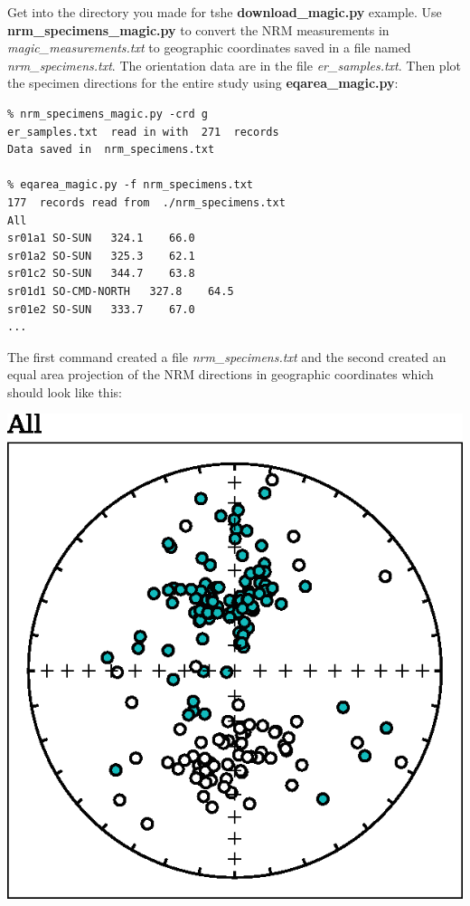 \documentclass[11pt]{book}
\begin{document}
{{{Get into the directory you made for tshe {\bf download\_magic.py} example.   \newline Use {\bf nrm\_specimens\_magic.py} to convert the NRM measurements in  {\it magic\_measurements.txt }   to geographic coordinates saved in a file named {\it nrm\_specimens.txt}.  The orientation data are in the file {\it er\_samples.txt}.    Then plot the specimen directions for the entire study using {\bf eqarea\_magic.py}:
 
 
 \begin{verbatim}
% nrm_specimens_magic.py -crd g
er_samples.txt  read in with  271  records
Data saved in  nrm_specimens.txt

% eqarea_magic.py -f nrm_specimens.txt
177  records read from  ./nrm_specimens.txt
All
sr01a1 SO-SUN   324.1    66.0
sr01a2 SO-SUN   325.3    62.1
sr01c2 SO-SUN   344.7    63.8
sr01d1 SO-CMD-NORTH   327.8    64.5
sr01e2 SO-SUN   333.7    67.0
...

 \end{verbatim}
 
 The first command created a file {\it nrm\_specimens.txt} and the second created an equal area projection of the NRM directions in geographic coordinates which should look like this:
 
\includegraphics[width=12 cm]{EPSfiles/nrm-eq.eps}
% 


}}}
\end{document}
